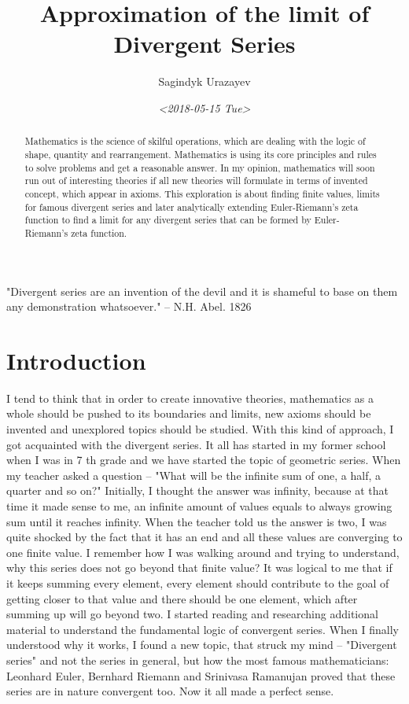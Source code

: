 \documentclass[11pt]{article}
\author{Sagindyk Urazayev}
\date{\textit{<2018-05-15 Tue>}}
\title{Approximation of the limit of Divergent Series}
\begin{document}
\maketitle
\tableofcontents

\listoffigures
\listoftables

\newpage
\begin{center}
"Divergent series are an invention of the devil and it is shameful to base on
them any demonstration whatsoever."\cite{Abel} -- N.H. Abel. 1826
\end{center}

\begin{abstract}
Mathematics is the science of skilful operations, which are dealing with the
logic of shape, quantity and rearrangement. Mathematics is using its core
principles and rules to solve problems and get a reasonable answer. In my
opinion, mathematics will soon run out of interesting theories if all new
theories will formulate in terms of invented concept, which appear in
axioms. This exploration is about finding finite values, limits for famous
divergent series and later analytically extending Euler-Riemann's zeta function
to find a limit for any divergent series that can be formed by Euler- Riemann's
zeta function.
\end{abstract}

\section{Introduction}
\label{sec:orgdb565cb}
\label{org5ff4313}

I tend to think that in order to create innovative theories, mathematics as a
whole should be pushed to its boundaries and limits, new axioms should be
invented and unexplored topics should be studied. With this kind of approach, I
got acquainted with the divergent series. It all has started in my former school
when I was in 7 th grade and we have started the topic of geometric series. When
my teacher asked a question – "What will be the infinite sum of one, a half, a
quarter and so on?" Initially, I thought the answer was infinity, because at
that time it made sense to me, an infinite amount of values equals to always
growing sum until it reaches infinity. When the teacher told us the answer is
two, I was quite shocked by the fact that it has an end and all these values are
converging to one finite value. I remember how I was walking around and trying
to understand, why this series does not go beyond that finite value? It was
logical to me that if it keeps summing every element, every element should
contribute to the goal of getting closer to that value and there should be one
element, which after summing up will go beyond two. I started reading and
researching additional material to understand the fundamental logic of
convergent series. When I finally understood why it works, I found a new topic,
that struck my mind – "Divergent series" and not the series in general, but how
the most famous mathematicians: Leonhard Euler, Bernhard Riemann and Srinivasa
Ramanujan proved that these series are in nature convergent too. Now it all made
a perfect sense.  
\end{document}
